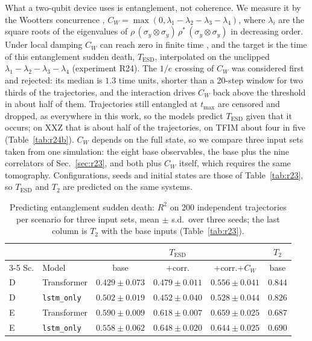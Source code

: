 \documentclass[twocolumn,10pt]{article}
\begin{document}
What a two-qubit device uses is entanglement, not coherence. We measure
it by the Wootters concurrence \cite{Wootters1998},
$C_W = \max(0, \lambda_1 - \lambda_2 - \lambda_3 - \lambda_4)$, where
$\lambda_i$ are the square roots of the eigenvalues of
$\rho\,(\sigma_y\otimes\sigma_y)\,\rho^*\,(\sigma_y\otimes\sigma_y)$ in
decreasing order. Under local damping $C_W$ can reach zero in finite time
\cite{YuEberly2009}, and the target is the time of this entanglement
sudden death, $T_\mathrm{ESD}$, interpolated on the unclipped
$\lambda_1 - \lambda_2 - \lambda_3 - \lambda_4$ (experiment R24).
The $1/e$ crossing of $C_W$ was considered first and rejected: its median
is $1.3$ time units, shorter than a 20-step window for two thirds of the
trajectories, and the interaction drives $C_W$ back above the threshold
in about half of them.
Trajectories still entangled at $t_\mathrm{max}$ are censored and
dropped, as everywhere in this work, so the models predict
$T_\mathrm{ESD}$ given that it occurs; on XXZ that is about half of the
trajectories, on TFIM about four in five (Table~\ref{tab:r24b}).
$C_W$ depends on the full state, so we compare three input sets taken
from one simulation: the eight base observables, the base plus the nine
correlators of Sec.~\ref{sec:r23}, and both plus $C_W$ itself, which
requires the same tomography. Configurations, seeds and initial states are
those of Table~\ref{tab:r23}, so $T_\mathrm{ESD}$ and $T_2$ are predicted
on the same systems.

\begin{table}[h]
\centering
\caption{Predicting entanglement sudden death: $R^2$ on 200 independent
  trajectories per scenario for three input sets, mean $\pm$ s.d.\ over
  three seeds; the last column is $T_2$ with the base inputs
  (Table~\ref{tab:r23}).\label{tab:r24}}
\footnotesize
\setlength{\tabcolsep}{2pt}
\begin{tabular}{llcccc}
\toprule
 & & \multicolumn{3}{c}{$T_\mathrm{ESD}$} & $T_2$ \\
\cmidrule(lr){3-5}
Sc. & Model & base & $+$corr. & $+$corr.$+C_W$ & base \\
\midrule
D & Transformer & $0.429 \pm 0.073$ & $0.479 \pm 0.011$ & $\mathbf{0.556 \pm 0.041}$ & $0.844$ \\
D & \texttt{lstm\_only} & $0.502 \pm 0.019$ & $0.452 \pm 0.040$ & $0.528 \pm 0.044$ & $0.826$ \\
E & Transformer & $0.590 \pm 0.009$ & $0.618 \pm 0.007$ & $\mathbf{0.659 \pm 0.025}$ & $0.687$ \\
E & \texttt{lstm\_only} & $0.558 \pm 0.062$ & $0.648 \pm 0.020$ & $0.644 \pm 0.025$ & $0.690$ \\
\bottomrule
\end{tabular}
\end{table}
\end{document}
